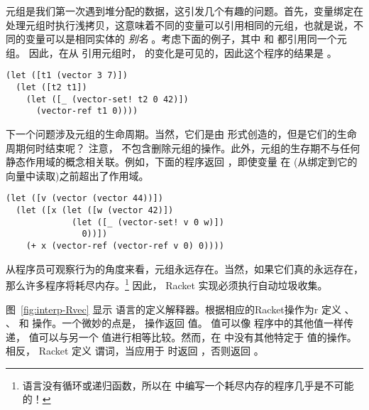 \documentclass[11pt]{book}
\begin{document}
元组是我们第一次遇到堆分配的数据，这引发几个有趣的问题。首先，变量绑定在处理元组时执行浅拷贝，这意味着不同的变量可以引用相同的元组，也就是说，不同的变量可以是相同实体的 \emph{别名} 。考虑下面的例子，其中  和  都引用同一个元组。
因此，在从  引用元组时，  的变化是可见的，因此这个程序的结果是  。
\begin{center}
\begin{minipage}{0.96\textwidth}
\begin{lstlisting}
(let ([t1 (vector 3 7)])
  (let ([t2 t1])
    (let ([_ (vector-set! t2 0 42)])
      (vector-ref t1 0))))
\end{lstlisting}
\end{minipage}
\end{center}

下一个问题涉及元组的生命周期。当然，它们是由  形式创造的，但是它们的生命周期何时结束呢？
注意， \LangVec{} 不包含删除元组的操作。此外，元组的生存期不与任何静态作用域的概念相关联。例如，下面的程序返回  ，即使变量  在  (从绑定到它的向量中读取)之前超出了作用域。
\begin{center}
\begin{minipage}{0.96\textwidth}
\begin{lstlisting}
(let ([v (vector (vector 44))])
  (let ([x (let ([w (vector 42)])
             (let ([_ (vector-set! v 0 w)])
               0))])
    (+ x (vector-ref (vector-ref v 0) 0))))
\end{lstlisting}
\end{minipage}
\end{center}

从程序员可观察行为的角度来看，元组永远存在。当然，如果它们真的永远存在，那么许多程序将耗尽内存。\footnote{ \LangVec{} 语言没有循环或递归函数，所以在 \LangVec{} 中编写一个耗尽内存的程序几乎是不可能的！} 因此， Racket 实现必须执行自动垃圾收集。

图~\ref{fig:interp-Rvec} 显示
\LangVec{} 语言的定义解释器。根据相应的Racket操作为r \LangVec{} 定义  、  、
 和  操作。一个微妙的点是，   操作返回 
值。  值可以像 \LangVec{} 程序中的其他值一样传递，  值可以与另一个  值进行相等比较。然而，在 \LangVec{} 中没有其他特定于 
值的操作。相反， Racket 定义  谓词，当应用于  时返回  ，否则返回  。
\end{document}
